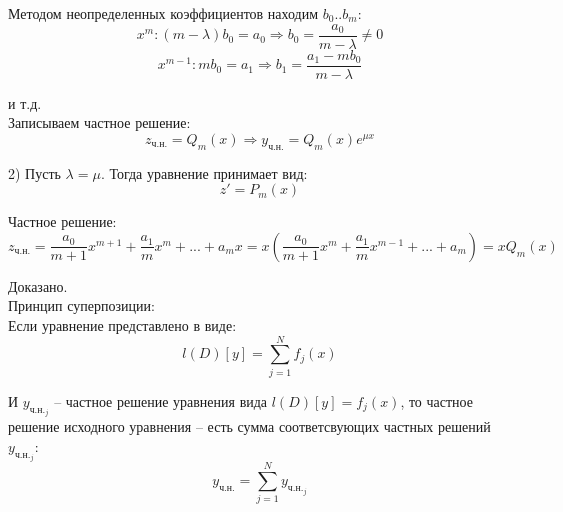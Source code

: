 \documentclass{article}
\begin{document}
	Методом неопределенных коэффициентов находим $b_0..b_m$:
	\begin{equation}
		x^m: (m-\lambda)b_0 = a_0 \Rightarrow b_0=\frac{a_0}{m-\lambda}\neq 0
	\end{equation}
	\begin{equation}
		x^{m-1}: mb_0 = a_1 \Rightarrow b_1=\frac{a_1-mb_0}{m-\lambda}
	\end{equation}

	и т.д.\\

	Записываем частное решение:
	\begin{equation}
		z_\text{ч.н.}=Q_m(x)\Rightarrow y_\text{ч.н.} = Q_m(x)e^{\mu x}
	\end{equation}

	2) Пусть $\lambda=\mu$. Тогда уравнение принимает вид:
	\begin{equation}
		z'=P_m(x)
	\end{equation}

	Частное решение:
	\begin{equation}
		z_\text{ч.н.} = \frac{a_0}{m+1}x^{m+1}+\frac{a_1}{m}x^m+...+a_mx=x(\frac{a_0}{m+1}x^m+\frac{a_1}{m}x^{m-1}+...+a_m)=xQ_m(x)
	\end{equation}

	Доказано.\\

	Принцип суперпозиции:\\

	Если уравнение представлено в виде:
	\begin{equation}
		l(D)[y] = \sum_{j=1}^N f_j(x)
	\end{equation}

	И $y_{\text{ч.н.}_j}$ -- частное решение уравнения вида $l(D)[y] = f_j(x)$, то частное решение исходного уравнения -- есть сумма соответсвующих частных решений $y_{\text{ч.н.}_j}$:
	\begin{equation}
		y_{\text{ч.н.}} = \sum_{j=1}^N y_{\text{ч.н.}_j}
	\end{equation}
\end{document}
